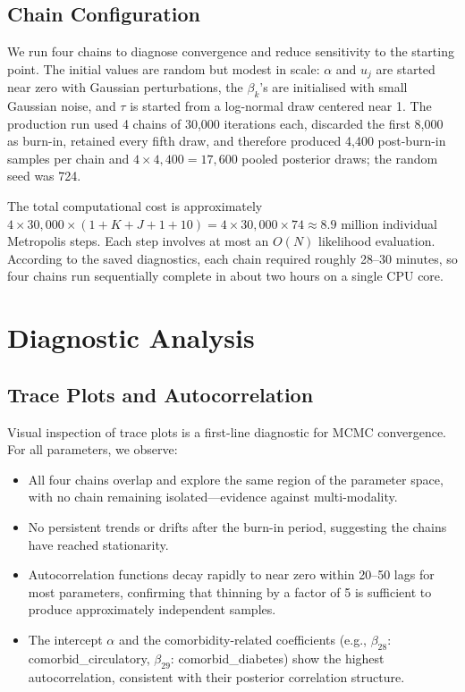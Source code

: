 \documentclass[10pt]{article}
\begin{document}
\subsection{Chain Configuration}

We run four chains to diagnose convergence and reduce sensitivity to the
starting point.  The initial values are random but modest in scale:
$\alpha$ and $u_j$ are started near zero with Gaussian perturbations, the
$\beta_k$'s are initialised with small Gaussian noise, and $\tau$ is started
from a log-normal draw centered near 1. The production run used 4 chains of
30,000 iterations each, discarded the first 8,000 as burn-in, retained every
fifth draw, and therefore produced 4,400 post-burn-in samples per chain and
$4 \times 4{,}400 = 17{,}600$ pooled posterior draws; the random seed was 724.

The total computational cost is approximately $4 \times 30{,}000 \times
(1 + K + J + 1 + 10) = 4 \times 30{,}000 \times 74 \approx 8.9$ million
individual Metropolis steps.  Each step involves at most an $O(N)$ likelihood
evaluation.  According to the saved diagnostics, each chain required roughly
28--30 minutes, so four chains run sequentially complete in about two hours on
a single CPU core.

\section{Diagnostic Analysis}
\label{sec:diagnostics}

\subsection{Trace Plots and Autocorrelation}

Visual inspection of trace plots is a first-line diagnostic for MCMC
convergence.  For all parameters, we observe:
\begin{itemize}
  \item All four chains overlap and explore the same region of the parameter
    space, with no chain remaining isolated---evidence against multi-modality.
  \item No persistent trends or drifts after the burn-in period, suggesting
    the chains have reached stationarity.
  \item Autocorrelation functions decay rapidly to near zero within 20--50
    lags for most parameters, confirming that thinning by a factor of 5 is
    sufficient to produce approximately independent samples.
  \item The intercept $\alpha$ and the comorbidity-related coefficients (e.g.,
    $\beta_{28}$: comorbid\_circulatory, $\beta_{29}$:
    comorbid\_diabetes) show the highest autocorrelation, consistent
    with their posterior correlation structure.
\end{itemize}
\end{document}
